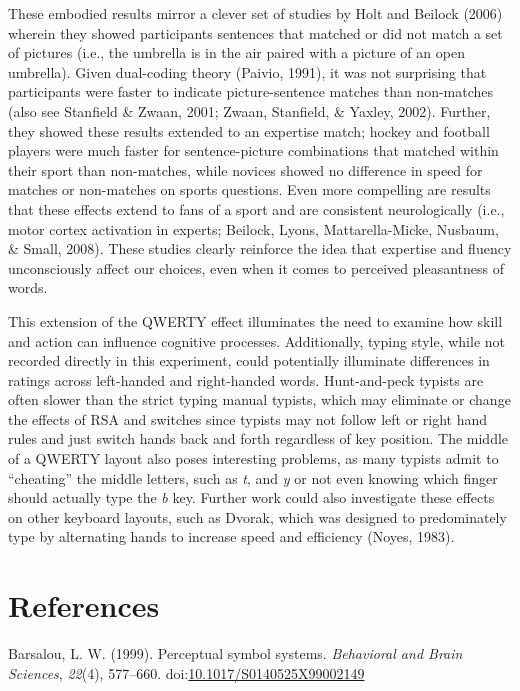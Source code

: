 \documentclass[english,man, mask]{apa6}
\theoremstyle{definition}
\theoremstyle{definition}
\theoremstyle{definition}
\theoremstyle{remark}
\begin{document}
These embodied results mirror a clever set of studies by Holt and
Beilock (2006) wherein they showed participants sentences that matched
or did not match a set of pictures (i.e., the umbrella is in the air
paired with a picture of an open umbrella). Given dual-coding theory
(Paivio, 1991), it was not surprising that participants were faster to
indicate picture-sentence matches than non-matches (also see Stanfield
\& Zwaan, 2001; Zwaan, Stanfield, \& Yaxley, 2002). Further, they showed
these results extended to an expertise match; hockey and football
players were much faster for sentence-picture combinations that matched
within their sport than non-matches, while novices showed no difference
in speed for matches or non-matches on sports questions. Even more
compelling are results that these effects extend to fans of a sport and
are consistent neurologically (i.e., motor cortex activation in experts;
Beilock, Lyons, Mattarella-Micke, Nusbaum, \& Small, 2008). These
studies clearly reinforce the idea that expertise and fluency
unconsciously affect our choices, even when it comes to perceived
pleasantness of words.

This extension of the QWERTY effect illuminates the need to examine how
skill and action can influence cognitive processes. Additionally, typing
style, while not recorded directly in this experiment, could potentially
illuminate differences in ratings across left-handed and right-handed
words. Hunt-and-peck typists are often slower than the strict typing
manual typists, which may eliminate or change the effects of RSA and
switches since typists may not follow left or right hand rules and just
switch hands back and forth regardless of key position. The middle of a
QWERTY layout also poses interesting problems, as many typists admit to
\enquote{cheating} the middle letters, such as \emph{t}, and \emph{y} or
not even knowing which finger should actually type the \emph{b} key.
Further work could also investigate these effects on other keyboard
layouts, such as Dvorak, which was designed to predominately type by
alternating hands to increase speed and efficiency (Noyes, 1983).

\newpage

\section{References}\label{references}

\setlength{\parindent}{-0.5in} \setlength{\leftskip}{0.5in}

\hypertarget{refs}{}
\hypertarget{ref-Barsalou1999}{}
Barsalou, L. W. (1999). Perceptual symbol systems. \emph{Behavioral and
Brain Sciences}, \emph{22}(4), 577--660.
doi:\href{https://doi.org/10.1017/S0140525X99002149}{10.1017/S0140525X99002149}
\end{document}
